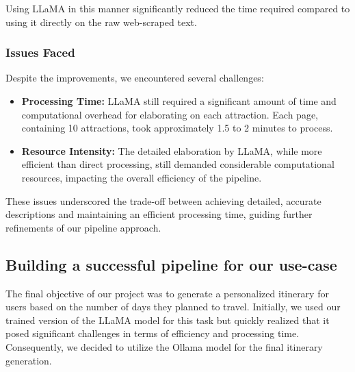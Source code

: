\documentclass[conference]{IEEEtran}
\begin{document}
            Using LLaMA in this manner significantly reduced the time required compared to using it directly on the raw web-scraped text.
        
        \subsubsection{Issues Faced}
            Despite the improvements, we encountered several challenges:
            \begin{itemize}
                \item \textbf{Processing Time:} LLaMA still required a significant amount of time and computational overhead for elaborating on each attraction. Each page, containing 10 attractions, took approximately 1.5 to 2 minutes to process.
                \item \textbf{Resource Intensity:} The detailed elaboration by LLaMA, while more efficient than direct processing, still demanded considerable computational resources, impacting the overall efficiency of the pipeline.
            \end{itemize}
            
            These issues underscored the trade-off between achieving detailed, accurate descriptions and maintaining an efficient processing time, guiding further refinements of our pipeline approach.
        
    \subsection{Building a successful pipeline for our use-case}
        
        The final objective of our project was to generate a personalized itinerary for users based on the number of days they planned to travel. Initially, we used our trained version of the LLaMA model for this task but quickly realized that it posed significant challenges in terms of efficiency and processing time. Consequently, we decided to utilize the Ollama model for the final itinerary generation.
        
\end{document}
